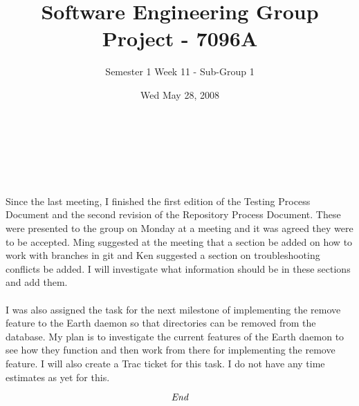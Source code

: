 \documentclass[10pt, a4]{article}
\begin{document}
 
\title{Software Engineering Group Project - 7096A}
\author{Semester 1 Week 11 - Sub-Group 1}
\date{Wed May 28, 2008}
 
\maketitle 
 
\\
\paragraph{}
\\
\paragraph{}
Since the last meeting, I finished the first edition of the Testing  
Process Document and the second revision of the  Repository Process  
Document. These were presented to the group on Monday at a meeting and  
it was agreed they were to be accepted. Ming suggested at the meeting  
that a section be added on how to work with branches in git and Ken  
suggested a section on troubleshooting conflicts be added. I will  
investigate what information should be in these sections and add them.

\paragraph{}
I was also assigned the task for the next milestone of implementing  
the remove feature to the Earth daemon so that directories can be  
removed from the database. My plan is to investigate the current  
features of the Earth daemon to see how they function and then work  
from there for implementing the remove feature. I will also create a  
Trac ticket for this task. I do not have any time estimates as yet for  
this.

\[\emph{End}\]
 
\end{document}
